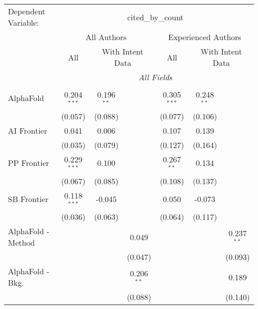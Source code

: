 \begingroup
\centering
\begin{tabular}{lcccccc}
   \tabularnewline \midrule \midrule
   Dependent Variable: & \multicolumn{6}{c}{cited\_by\_count}\\
 & \multicolumn{3}{c}{All Authors} & \multicolumn{3}{c}{Experienced Authors} \\
\cmidrule(lr){2-4} \cmidrule(lr){5-7}
 & \multicolumn{1}{c}{All} & \multicolumn{2}{c}{With Intent Data} & \multicolumn{1}{c}{All} & \multicolumn{2}{c}{With Intent Data} \\
\cmidrule(lr){2-2} \cmidrule(lr){3-4} \cmidrule(lr){5-5} \cmidrule(lr){6-7}
 & \multicolumn{6}{c}{\textit{All Fields}} \\ \\
   AlphaFold            & 0.204$^{***}$ & 0.196$^{**}$ &                & 0.305$^{***}$ & 0.248$^{**}$ &   \\   
                        & (0.057)       & (0.088)      &                & (0.077)       & (0.106)      &   \\   
   AI Frontier          & 0.041         & 0.006        &                & 0.107         & 0.139        &   \\   
                        & (0.035)       & (0.079)      &                & (0.127)       & (0.164)      &   \\   
   PP Frontier          & 0.229$^{***}$ & 0.100        &                & 0.267$^{**}$  & 0.134        &   \\   
                        & (0.067)       & (0.085)      &                & (0.108)       & (0.137)      &   \\   
   SB Frontier          & 0.118$^{***}$ & -0.045       &                & 0.050         & -0.073       &   \\   
                        & (0.036)       & (0.063)      &                & (0.064)       & (0.117)      &   \\   
   AlphaFold - Method   &               &              & 0.049          &               &              & 0.237$^{**}$\\   
                        &               &              & (0.047)        &               &              & (0.093)\\   
   AlphaFold - Bkg.     &               &              & 0.206$^{**}$   &               &              & 0.189\\   
                        &               &              & (0.088)        &               &              & (0.140)\\   

\end{tabular}
